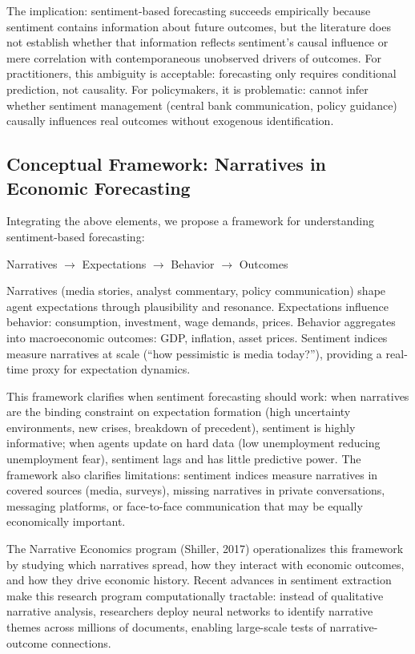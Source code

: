 \documentclass[11pt]{article}
\begin{document}
The implication: sentiment-based forecasting succeeds empirically because sentiment contains information about future outcomes, but the literature does not establish whether that information reflects sentiment's causal influence or mere correlation with contemporaneous unobserved drivers of outcomes. For practitioners, this ambiguity is acceptable: forecasting only requires conditional prediction, not causality. For policymakers, it is problematic: cannot infer whether sentiment management (central bank communication, policy guidance) causally influences real outcomes without exogenous identification.

\subsection{Conceptual Framework: Narratives in Economic Forecasting}

Integrating the above elements, we propose a framework for understanding sentiment-based forecasting:

\noindent
Narratives $\rightarrow$ Expectations $\rightarrow$ Behavior $\rightarrow$ Outcomes

Narratives (media stories, analyst commentary, policy communication) shape agent expectations through plausibility and resonance. Expectations influence behavior: consumption, investment, wage demands, prices. Behavior aggregates into macroeconomic outcomes: GDP, inflation, asset prices. Sentiment indices measure narratives at scale (``how pessimistic is media today?''), providing a real-time proxy for expectation dynamics.

This framework clarifies when sentiment forecasting should work: when narratives are the binding constraint on expectation formation (high uncertainty environments, new crises, breakdown of precedent), sentiment is highly informative; when agents update on hard data (low unemployment reducing unemployment fear), sentiment lags and has little predictive power. The framework also clarifies limitations: sentiment indices measure narratives in covered sources (media, surveys), missing narratives in private conversations, messaging platforms, or face-to-face communication that may be equally economically important.

The Narrative Economics program (Shiller, 2017) operationalizes this framework by studying which narratives spread, how they interact with economic outcomes, and how they drive economic history. Recent advances in sentiment extraction make this research program computationally tractable: instead of qualitative narrative analysis, researchers deploy neural networks to identify narrative themes across millions of documents, enabling large-scale tests of narrative-outcome connections.
\end{document}
